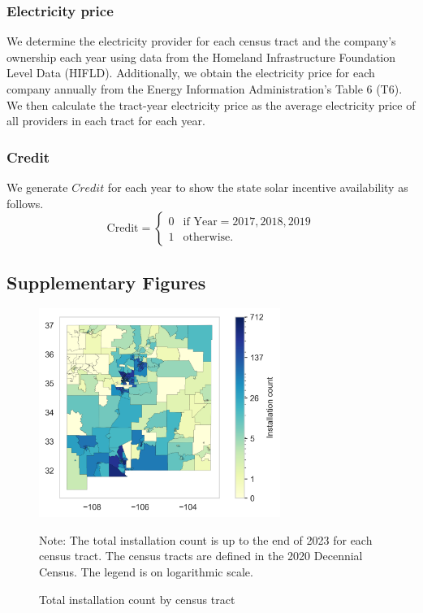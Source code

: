 \documentclass[11pt,twoside,letterpaper]{article}
\begin{document}
\subsubsection*{Electricity price}
We determine the electricity provider for each census tract and the company's ownership each year using data from the Homeland Infrastructure Foundation Level Data (HIFLD). Additionally, we obtain the electricity price for each company annually from the Energy Information Administration's Table 6 (T6). We then calculate the tract-year electricity price as the average electricity price of all providers in each tract for each year.


\subsubsection*{Credit}
We generate $Credit$ for each year to show the state solar incentive availability as follows.  
\[
\text{Credit} = 
\begin{cases} 
 0 & \text{if } \text{Year} = 2017, 2018, 2019 \\
 1 & \text{otherwise.}
\end{cases} 
\]


\subsection{Supplementary Figures}

\begin{figure}[!ht]
    \centering
\includegraphics[width=0.7\textwidth]{figures/tract_count_map.png}
    \caption{Total installation count by census tract}
    \label{fig:tract_map}
    \begin{flushleft}
        \footnotesize Note: The total installation count is up to the end of 2023 for each census tract. The census tracts are defined in the 2020 Decennial Census. The legend is on logarithmic scale.
    \end{flushleft}
\end{figure}
\end{document}
